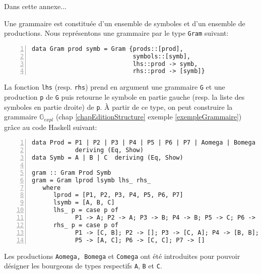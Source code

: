 \label{annexeFonctionsHask}
\mySaveMarks
Dans cette annexe...

Une grammaire est constituée d'un ensemble de symboles et d'un ensemble de productions. Nous représentons une grammaire par le type \Verb|Gram| suivant:
\begin{Verbatim}[fontsize=\small, numbers=left, numbersep=8pt]
data Gram prod symb = Gram {prods::[prod], 
                            symbols::[symb], 
                            lhs::prod -> symb, 
                            rhs::prod -> [symb]}
\end{Verbatim}

La fonction \Verb|lhs| (resp. \Verb|rhs|) prend en argument une grammaire \Verb|G| et une production \Verb|p| de \Verb|G| puis retourne le symbole en partie gauche (resp. la liste des symboles en partie droite) de \Verb|p|. \`{A} partir de ce type, on peut construire la grammaire $\mathbb{G}_{expl}$ (chap \ref{chapEditionStructure} exemple \ref{exempleGrammaire}) grâce au code Haskell suivant:
\begin{Verbatim}[fontsize=\small, numbers=left, numbersep=8pt]
data Prod = P1 | P2 | P3 | P4 | P5 | P6 | P7 | Aomega | Bomega | Comega
            deriving (Eq, Show)
data Symb = A | B | C  deriving (Eq, Show)

gram :: Gram Prod Symb
gram = Gram lprod lsymb lhs_ rhs_
   where
      lprod = [P1, P2, P3, P4, P5, P6, P7]
      lsymb = [A, B, C]
      lhs_ p = case p of
            P1 -> A; P2 -> A; P3 -> B; P4 -> B; P5 -> C; P6 -> C; P7 -> C
      rhs_ p = case p of
            P1 -> [C, B]; P2 -> []; P3 -> [C, A]; P4 -> [B, B]; 
            P5 -> [A, C]; P6 -> [C, C]; P7 -> []
\end{Verbatim}

Les productions \Verb|Aomega, Bomega| et \Verb|Comega| ont été introduites pour pouvoir désigner les bourgeons de types respectifs \Verb|A|, \Verb|B| et \Verb|C|.


\myRestoreMarks
